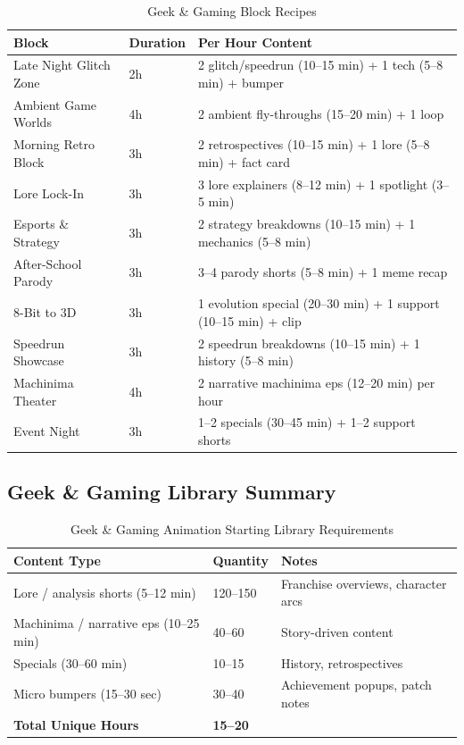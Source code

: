 \documentclass[12pt,letterpaper,twoside]{report}
\begin{document}
\begin{table}[H]
\centering
\caption{Geek \& Gaming Block Recipes}
\label{tab:gaming-recipes}
\begin{tabular}{@{}L{4cm}L{2cm}L{7.5cm}@{}}
\toprule
\textbf{Block} & \textbf{Duration} & \textbf{Per Hour Content} \\
\midrule
Late Night Glitch Zone & 2h & 2 glitch/speedrun (10--15 min) + 1 tech (5--8 min) + bumper \\
Ambient Game Worlds & 4h & 2 ambient fly-throughs (15--20 min) + 1 loop \\
Morning Retro Block & 3h & 2 retrospectives (10--15 min) + 1 lore (5--8 min) + fact card \\
Lore Lock-In & 3h & 3 lore explainers (8--12 min) + 1 spotlight (3--5 min) \\
Esports \& Strategy & 3h & 2 strategy breakdowns (10--15 min) + 1 mechanics (5--8 min) \\
After-School Parody & 3h & 3--4 parody shorts (5--8 min) + 1 meme recap \\
8-Bit to 3D & 3h & 1 evolution special (20--30 min) + 1 support (10--15 min) + clip \\
Speedrun Showcase & 3h & 2 speedrun breakdowns (10--15 min) + 1 history (5--8 min) \\
Machinima Theater & 4h & 2 narrative machinima eps (12--20 min) per hour \\
Event Night & 3h & 1--2 specials (30--45 min) + 1--2 support shorts \\
\bottomrule
\end{tabular}
\end{table}

\subsection{Geek \& Gaming Library Summary}

\begin{table}[H]
\centering
\caption{Geek \& Gaming Animation Starting Library Requirements}
\label{tab:gaming-library}
\begin{tabular}{@{}L{6cm}R{3cm}L{5cm}@{}}
\toprule
\textbf{Content Type} & \textbf{Quantity} & \textbf{Notes} \\
\midrule
Lore / analysis shorts (5--12 min) & 120--150 & Franchise overviews, character arcs \\
Machinima / narrative eps (10--25 min) & 40--60 & Story-driven content \\
Specials (30--60 min) & 10--15 & History, retrospectives \\
Micro bumpers (15--30 sec) & 30--40 & Achievement popups, patch notes \\
\midrule
\textbf{Total Unique Hours} & \textbf{15--20} & \\
\bottomrule
\end{tabular}
\end{table}
\end{document}
